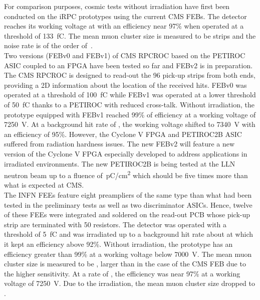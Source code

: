 	For comparison purposes, cosmic tests without irradiation have first been conducted on the iRPC prototypes using the current CMS FEBs. The detector reaches its working voltage at  with an efficiency near 97\% when operated at a threshold of \SI{133}{fC}. The mean muon cluster size is measured to be  strips and the noise rate is of the order of \,\sirate.\\
	Two versions (FEBv0 and FEBv1) of CMS RPCROC based on the PETIROC ASIC coupled to an FPGA have been tested so far and FEBv2 is in preparation. The CMS RPCROC is designed to read-out the 96 pick-up strips from both ends, providing a 2D information about the location of the received hits. FEBv0 was operated at a threshold of \SI{100}{fC} while FEBv1 was operated at a lower threshold of \SI{50}{fC} thanks to a PETIROC with reduced cross-talk. Without irradiation, the prototype equipped with FEBv1 reached 99\% of efficiency at a working voltage of \SI{7250}{V}. At a background hit rate of , the working voltage shifted to \SI{7340}{V} with an efficiency of 95\%. However, the Cyclone V FPGA and PETIROC2B ASIC suffered from radiation hardness issues. The new FEBv2 will feature a new version of the Cyclone V FPGA especially developed to address applications in irradiated environments. The new PETIROC2B is being tested at the LLN neutron beam up to a fluence of \,\si{pC/cm^2} which should be five times more than what is expected at CMS.\\
	The INFN FEEs feature eight preampliers of the same type than what had been tested in the preliminary tests as well as two discriminator ASICs. Hence, twelve of these FEEs were integrated and soldered on the read-out PCB whose pick-up strip are terminated with \SI{50}{\Ohm} resistors. The detector was operated with a threshold of \SI{5}{fC} and was irradiated up to a background hit rate about  at which it kept an efficiency above 92\%. Without irradiation, the prototype has an efficiency greater than 99\% at a working voltage below \SI{7000}{V}. The mean muon cluster size is measured to be , larger than in the case of the CMS FEB due to the higher sensitivity. At a rate of , the efficiency was near 97\% at a working voltage of \SI{7250}{V}. Due to the irradiation, the mean muon cluster size dropped to .
	
